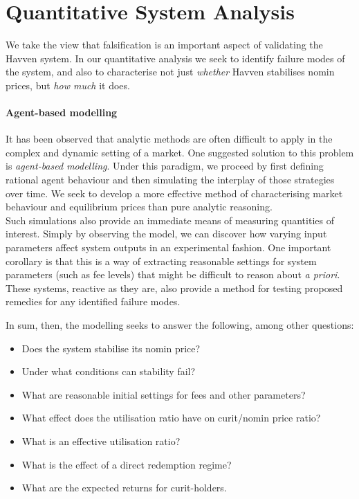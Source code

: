 \section{Quantitative System Analysis}

We take the view that falsification is an important aspect of validating
the Havven system. In our quantitative analysis we seek to identify failure modes
of the system, and also to characterise not just \textit{whether} Havven stabilises
nomin prices, but \textit{how much} it does.

\paragraph{Agent-based modelling} It has been observed that analytic methods are often difficult to
apply in the complex and dynamic setting of a market.
One suggested solution to this problem is \textit{agent-based modelling}.
Under this paradigm, we proceed by first defining rational agent behaviour
and then simulating the interplay of those strategies over time.
We seek to develop a more effective
method of characterising market behaviour and equilibrium prices than pure analytic reasoning.~\cite{poggio2001agent}\\

\noindent Such simulations also provide an immediate means of measuring
quantities of interest. Simply by observing
the model, we can discover how varying input parameters
affect system outputs in an experimental fashion.
One important corollary is that this is a way of extracting reasonable
settings for system parameters (such as fee levels) that might be difficult
to reason about \textit{a priori}. These systems, reactive as they are,
also provide a method for testing proposed remedies for any identified failure
modes.

\noindent In sum, then, the modelling seeks to answer the following, among other questions:

\begin{itemize}
    \item Does the system stabilise its nomin price?
    \item Under what conditions can stability fail?
    \item What are reasonable initial settings for fees and other parameters?
    \item What effect does the utilisation ratio have on curit/nomin price ratio?
    \item What is an effective utilisation ratio?
    \item What is the effect of a direct redemption regime?
    \item What are the expected returns for curit-holders.
\end{itemize}

